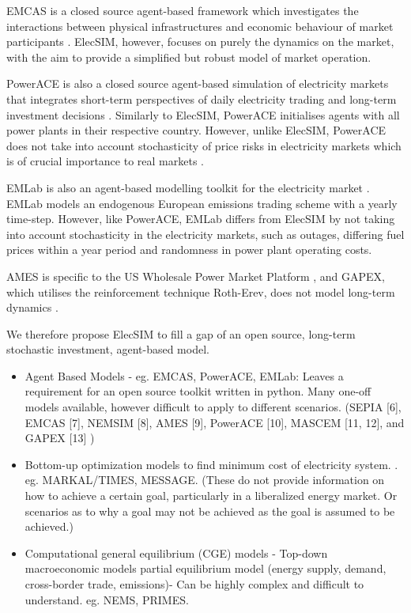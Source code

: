 EMCAS is a closed source agent-based framework which investigates the interactions between physical infrastructures and economic behaviour of market participants \cite{Conzelmann}. ElecSIM, however, focuses on purely the dynamics on the market, with the aim to provide a simplified but robust model of market operation. 

PowerACE is also a closed source agent-based simulation of electricity markets that integrates short-term perspectives of daily electricity trading and long-term investment decisions \cite{Rothengatter2007}. Similarly to ElecSIM, PowerACE initialises agents with all power plants in their respective country. However, unlike ElecSIM, PowerACE does not take into account stochasticity of price risks in electricity markets which is of crucial importance to real markets \cite{Most2010}.

EMLab is also an agent-based modelling toolkit for the electricity market \cite{Chappin2017}. EMLab models an endogenous European emissions trading scheme with a yearly time-step. However, like PowerACE, EMLab differs from ElecSIM by not taking into account stochasticity in the electricity markets, such as outages, differing fuel prices within a year period and randomness in power plant operating costs.

AMES is specific to the US Wholesale Power Market Platform \cite{Sun2007}, and GAPEX, which utilises the reinforcement technique Roth-Erev, does not model long-term dynamics \cite{Cincotti2013}. 

We therefore propose ElecSIM to fill a gap of an open source, long-term stochastic investment, agent-based model.

\begin{itemize}
	\item Agent Based Models - eg. EMCAS, PowerACE, EMLab: Leaves a requirement for an open source toolkit written in python. Many one-off models available, however difficult to apply to different scenarios.
	(SEPIA [6], EMCAS [7], NEMSIM [8], AMES [9], PowerACE [10], MASCEM [11, 12], and GAPEX [13] \cite{Lopes})
	\item Bottom-up optimization models to find minimum cost of electricity system. \cite{Pfenninger2014}. eg. MARKAL/TIMES, MESSAGE. (These do not provide information on how to achieve a certain goal, particularly in a liberalized energy market. Or scenarios as to why a goal may not be achieved as the goal is assumed to be achieved.)
	\item Computational general equilibrium (CGE) models - Top-down macroeconomic models partial equilibrium model (energy supply, demand, cross-border trade, emissions)- Can be highly complex and difficult to understand. eg. NEMS, PRIMES.
\end{itemize}



